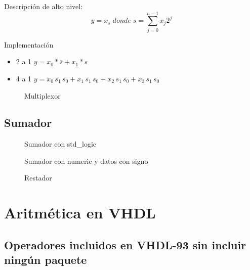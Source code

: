 Descripción de alto nivel:
\[
	y = x_{s} \; donde \; s=\sum^{n-1}_{j=0} x_{j}2^{j}
\]

Implementación
\begin{itemize}
	\item 2 a 1 $y = x_{0} * \overline{s} + x_{1} * s$
	\item 4 a 1 $y = x_{0}\,\overline{s_{1}}\,\overline{s_{0}} + x_{1}\,\overline{s_{1}} \,s_{0} + x_{2}\,s_{1}\,\overline{s_{0}} + x_{3}\,s_{1}\,s_{0}$
\end{itemize}

\begin{figure}[H]
	\centering
	
	\caption{Multiplexor}
\end{figure}
\newpage
\subsection{Sumador}
\begin{multicols}{2}
	\begin{figure}[H]
		\centering
		
		\caption{Sumador con std\_logic}
	\end{figure}
	\vfill
	\null
	\begin{figure}[H]
		\centering
		
		\caption{Sumador con numeric y datos con signo}
	\end{figure}
\end{multicols}

\begin{figure}[H]
	\centering
	
	\caption{Restador}
\end{figure}


\section{Aritmética en VHDL}
\subsection{Operadores incluidos en VHDL-93 sin incluir ningún paquete}

